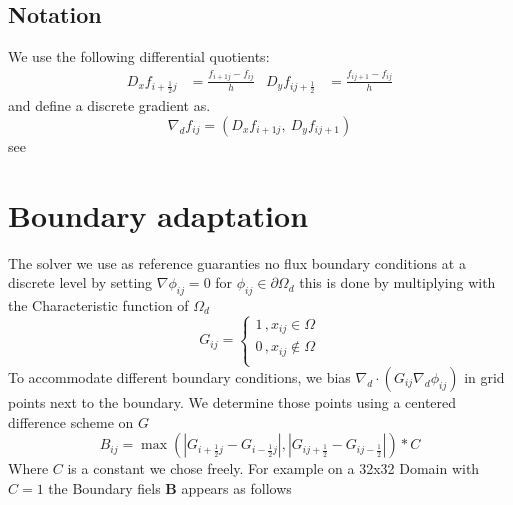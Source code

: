 \documentclass{mimosis}
\begin{document}
\section{Notation}
\label{sec:org6a9a752}
We use the following differential quotients:
\begin{align}
D_xf_{i+\frac{1}{2} j} &= \frac{f_{i+1j} - f_{ij}}{h} & D_yf_{ij+\frac{1}{2}} &= \frac{f_{ij+1} - f_{ij}}{h}
\end{align}
and define a discrete gradient as.
\begin{equation}
\nabla_d f_{ij} = (D_x f_{i+1j} , \ D_y f_{ij+1})
\end{equation}
see\autocite{Ulmer_CHRelaxed_2024}
\chapter{Boundary adaptation}
\label{sec:org0a373e8}
The solver we use as reference guaranties no flux boundary conditions at a discrete level by setting \(\nabla \phi_{ij} = 0\) for \(\phi_{ij} \in \partial \Omega_{d}\) this is done by multiplying with the Characteristic function of \(\Omega_{d}\)
\begin{equation}
G_{ij}=
\begin{cases}
1 \,, x_{ij} \in \Omega \\
0 \,, x_{ij} \not\in \Omega \\
\end{cases}
\end{equation}
To accommodate different boundary conditions, we bias \(\nabla_d \cdot (G_{ij} \nabla_d \phi_{ij})\) in grid points next to the boundary. We determine those points using a centered difference scheme on \(G\)
\begin{equation}
B_{ij} = \max\left(  |G_{i+\frac{1}{2}j} - G_{i-\frac{1}{2}j}| , |G_{ij+\frac{1}{2}} - G_{ij-\frac{1}{2}}|\right) * C
\end{equation}
Where \(C\) is a constant we chose freely. For example on a 32x32 Domain with \(C=1\) the Boundary fiels \(\mathbf{B}\) appears as follows
\end{document}
